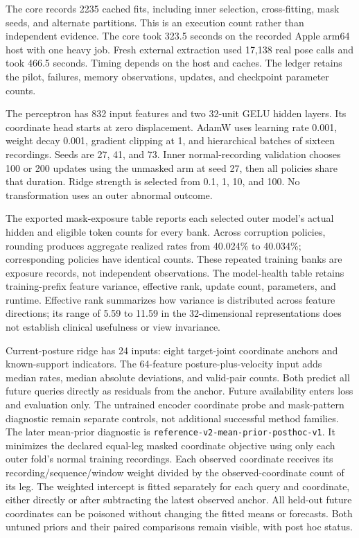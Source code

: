 \documentclass[letterpaper]{article}
\begin{document}
The core records 2235 cached fits, including inner selection, cross-fitting, mask seeds, and alternate partitions. This is an execution count rather than independent evidence. The core took 323.5 seconds on the recorded Apple arm64 host with one heavy job. Fresh external extraction used 17,138 real pose calls and took 466.5 seconds. Timing depends on the host and caches. The ledger retains the pilot, failures, memory observations, updates, and checkpoint parameter counts.

The perceptron has 832 input features and two 32-unit GELU hidden layers. Its coordinate head starts at zero displacement. AdamW uses learning rate 0.001, weight decay 0.001, gradient clipping at 1, and hierarchical batches of sixteen recordings. Seeds are 27, 41, and 73. Inner normal-recording validation chooses 100 or 200 updates using the unmasked arm at seed 27, then all policies share that duration. Ridge strength is selected from 0.1, 1, 10, and 100. No transformation uses an outer abnormal outcome.

The exported mask-exposure table reports each selected outer model's actual hidden and eligible token counts for every bank. Across corruption policies, rounding produces aggregate realized rates from 40.024\% to 40.034\%; corresponding policies have identical counts. These repeated training banks are exposure records, not independent observations. The model-health table retains training-prefix feature variance, effective rank, update count, parameters, and runtime. Effective rank summarizes how variance is distributed across feature directions; its range of 5.59 to 11.59 in the 32-dimensional representations does not establish clinical usefulness or view invariance.

Current-posture ridge has 24 inputs: eight target-joint coordinate anchors and known-support indicators. The 64-feature posture-plus-velocity input adds median rates, median absolute deviations, and valid-pair counts. Both predict all future queries directly as residuals from the anchor. Future availability enters loss and evaluation only. The untrained encoder coordinate probe and mask-pattern diagnostic remain separate controls, not additional successful method families. The later mean-prior diagnostic is \texttt{reference-v2-mean-prior-posthoc-v1}. It minimizes the declared equal-leg masked coordinate objective using only each outer fold's normal training recordings. Each observed coordinate receives its recording/sequence/window weight divided by the observed-coordinate count of its leg. The weighted intercept is fitted separately for each query and coordinate, either directly or after subtracting the latest observed anchor. All held-out future coordinates can be poisoned without changing the fitted means or forecasts. Both untuned priors and their paired comparisons remain visible, with post hoc status.
\end{document}
